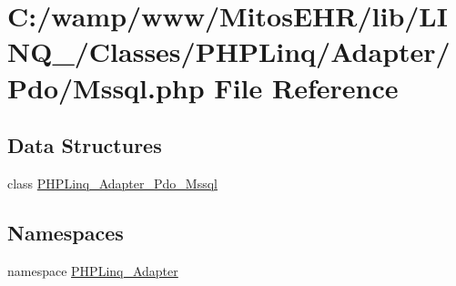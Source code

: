 \hypertarget{_mssql_8php}{\section{\-C\-:/wamp/www/\-Mitos\-E\-H\-R/lib/\-L\-I\-N\-Q\-\_/\-Classes/\-P\-H\-P\-Linq/\-Adapter/\-Pdo/\-Mssql.php \-File \-Reference}
\label{_mssql_8php}
}
\subsection*{\-Data \-Structures}
\begin{DoxyCompactItemize}
\item 
class \hyperlink{class_p_h_p_linq___adapter___pdo___mssql}{\-P\-H\-P\-Linq\-\_\-\-Adapter\-\_\-\-Pdo\-\_\-\-Mssql}
\end{DoxyCompactItemize}
\subsection*{\-Namespaces}
\begin{DoxyCompactItemize}
\item 
namespace \hyperlink{namespace_p_h_p_linq___adapter}{\-P\-H\-P\-Linq\-\_\-\-Adapter}
\end{DoxyCompactItemize}
